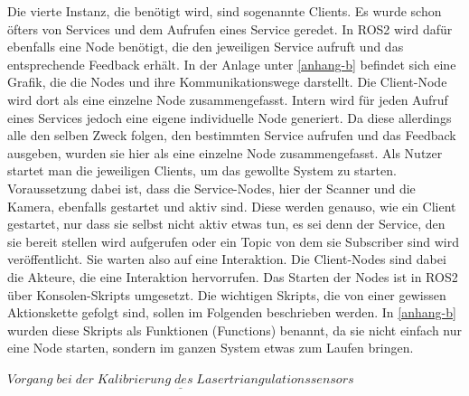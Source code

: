 		Die vierte Instanz, die benötigt wird, sind sogenannte Clients. Es wurde schon öfters von Services und dem Aufrufen eines Service geredet. In ROS2 wird dafür ebenfalls eine Node benötigt, die den jeweiligen Service aufruft und das entsprechende Feedback erhält. In der Anlage unter \ref{anhang-b} befindet sich eine Grafik, die die Nodes und ihre Kommunikationswege darstellt. Die Client-Node wird dort als eine einzelne Node zusammengefasst. Intern wird für jeden Aufruf eines Services jedoch eine eigene individuelle Node generiert. Da diese allerdings alle den selben Zweck folgen, den bestimmten Service aufrufen und das Feedback ausgeben, wurden sie hier als eine einzelne Node zusammengefasst. Als Nutzer startet man die jeweiligen Clients, um das gewollte System zu starten. Voraussetzung dabei ist, dass die Service-Nodes, hier der Scanner und die Kamera, ebenfalls gestartet und aktiv sind. Diese werden genauso, wie ein Client gestartet, nur dass sie selbst nicht aktiv etwas tun, es sei denn der Service, den sie bereit stellen wird aufgerufen oder ein Topic von dem sie Subscriber sind wird veröffentlicht. Sie warten also auf eine Interaktion. Die Client-Nodes sind dabei die Akteure, die eine Interaktion hervorrufen. Das Starten der Nodes ist in ROS2 über Konsolen-Skripts umgesetzt. Die wichtigen Skripts, die von einer gewissen Aktionskette gefolgt sind, sollen im Folgenden beschrieben werden. In \ref{anhang-b} wurden diese Skripts als Funktionen (Functions) benannt, da sie nicht einfach nur eine Node starten, sondern im ganzen System etwas zum Laufen bringen.
		
		$\underline{Vorgang\;bei\;der\;Kalibrierung\;des\;Lasertriangulationssensors}$
		
